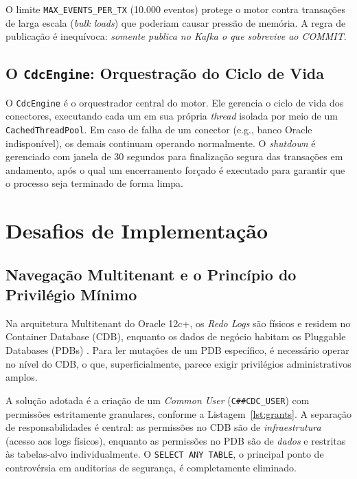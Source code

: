 \documentclass[12pt]{article}
\begin{document}
O limite \texttt{MAX\_EVENTS\_PER\_TX} (10.000 eventos) protege o motor
contra transações de larga escala (\textit{bulk loads}) que poderiam causar
pressão de memória. A regra de publicação é inequívoca: \textit{somente
publica no Kafka o que sobrevive ao COMMIT}.

\subsection{O \texttt{CdcEngine}: Orquestração do Ciclo de Vida}

O \texttt{CdcEngine} é o orquestrador central do motor. Ele gerencia o
ciclo de vida dos conectores, executando cada um em sua própria
\textit{thread} isolada por meio de um \texttt{CachedThreadPool}. Em caso
de falha de um conector (e.g., banco Oracle indisponível), os demais
continuam operando normalmente. O \textit{shutdown} é gerenciado com janela
de 30 segundos para finalização segura das transações em andamento, após
o qual um encerramento forçado é executado para garantir que o processo
seja terminado de forma limpa.


\section{Desafios de Implementação}
\label{sec:challenges}

\subsection{Navegação Multitenant e o Princípio do Privilégio Mínimo}

Na arquitetura Multitenant do Oracle 12c+, os \textit{Redo Logs} são físicos
e residem no Container Database (CDB), enquanto os dados de negócio habitam
os Pluggable Databases (PDBs) \cite{oracle:2023}. Para ler mutações de um
PDB específico, é necessário operar no nível do CDB, o que, superficialmente,
parece exigir privilégios administrativos amplos.

A solução adotada é a criação de um \textit{Common User} (\texttt{C\#\#CDC\_USER})
com permissões estritamente granulares, conforme a Listagem~\ref{lst:grants}.
A separação de responsabilidades é central: as permissões no CDB são de
\textit{infraestrutura} (acesso aos logs físicos), enquanto as permissões
no PDB são de \textit{dados} e restritas às tabelas-alvo individualmente.
O \texttt{SELECT ANY TABLE}, o principal ponto de controvérsia em
auditorias de segurança, é completamente eliminado.
\end{document}
